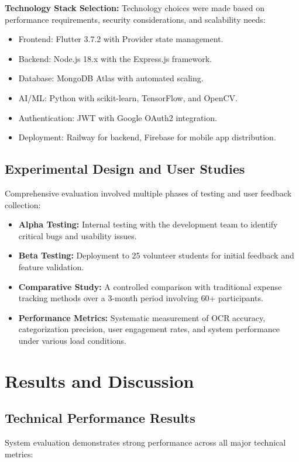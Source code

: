 \documentclass[10pt,twocolumn,twoside,a4paper]{article}
\begin{document}
\textbf{Technology Stack Selection:} Technology choices were made based on performance requirements, security considerations, and scalability needs:
\begin{itemize}[leftmargin=*]
  \item Frontend: Flutter 3.7.2 with Provider state management.
  \item Backend: Node.js 18.x with the Express.js framework.
  \item Database: MongoDB Atlas with automated scaling.
  \item AI/ML: Python with scikit-learn, TensorFlow, and OpenCV.
  \item Authentication: JWT with Google OAuth2 integration.
  \item Deployment: Railway for backend, Firebase for mobile app distribution.
\end{itemize}

\subsection{Experimental Design and User Studies}
Comprehensive evaluation involved multiple phases of testing and user feedback collection:
\begin{itemize}[leftmargin=*]
  \item \textbf{Alpha Testing:} Internal testing with the development team to identify critical bugs and usability issues.
  \item \textbf{Beta Testing:} Deployment to 25 volunteer students for initial feedback and feature validation.
  \item \textbf{Comparative Study:} A controlled comparison with traditional expense tracking methods over a 3-month period involving 60+ participants.
  \item \textbf{Performance Metrics:} Systematic measurement of OCR accuracy, categorization precision, user engagement rates, and system performance under various load conditions.
\end{itemize}

\section{Results and Discussion}
\subsection{Technical Performance Results}
System evaluation demonstrates strong performance across all major technical metrics:
\end{document}
